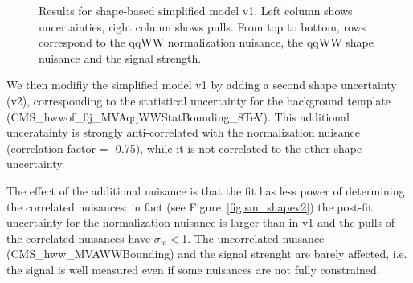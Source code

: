 \begin{figure}[!hbtp]
\caption{Results for shape-based simplified model v1. Left column shows uncertainties, right column shows pulls.
From top to bottom, rows correspond to the qqWW normalization nuisance, the qqWW shape nuisance and the signal strength.}
\label{fig:sm_shapev1}
\end{figure}

We then modifiy the simplified model v1 by adding a second shape uncertainty (v2), corresponding to the statistical uncertainty for 
the background template (CMS\_hwwof\_0j\_MVAqqWWStatBounding\_8TeV). This additional unceratainty is strongly anti-correlated with the
normalization nuisance (correlation factor = -0.75), while it is not correlated to the other shape uncertainty.

The effect of the additional nuisance is that the fit has less power of determining the correlated nuisances: 
in fact (see Figure~\ref{fig:sm_shapev2}) the post-fit uncertainty for the normalization nuisance is larger than in v1 and the pulls of the
correlated nuisances have $\sigma_w$$<$1. 
The uncorrelated nuisance (CMS\_hww\_MVAWWBounding) and the signal strenght are barely affected, 
i.e. the signal is well measured even if some nuisances are not fully constrained.

